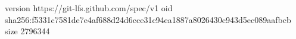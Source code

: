 version https://git-lfs.github.com/spec/v1
oid sha256:f5331c7581de7e4af688d24d6cce31c94ea1887a8026430c943d5ec089aafbcb
size 2796344
